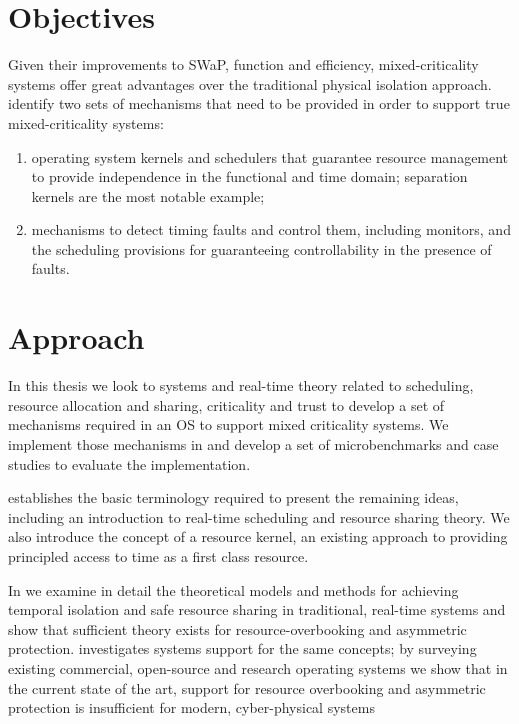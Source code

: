 \section{Objectives}

Given their improvements to \gls{SWaP}, function and efficiency, mixed-criticality systems offer
great advantages over the traditional physical isolation approach. 
\citet{Ernst_DiNatale_16} identify two sets of mechanisms that need to be provided in order to
support true mixed-criticality systems:

\begin{enumerate}
    \item operating system kernels and schedulers that guarantee resource
        management to provide independence in the
        functional and time domain; separation kernels
        are the most notable example;
    \item mechanisms to detect timing faults and control
        them, including monitors, and the scheduling
        provisions for guaranteeing controllability in the
        presence of faults.
\end{enumerate}


\section{Approach}

In this thesis we look to systems and real-time theory related to scheduling, resource allocation
and sharing, criticality and trust to develop a set of mechanisms required in an \gls{OS} to 
support mixed criticality systems. We implement those mechanisms in \selfour and develop a set of
microbenchmarks and case studies to evaluate the implementation. 

 establishes the basic terminology required to present
the remaining ideas, including an introduction to real-time scheduling and resource sharing theory.
We also introduce the concept of a resource kernel, an existing approach to providing principled
access to time as a first class resource.

In  we examine in detail the theoretical models and methods for achieving temporal
isolation and safe resource sharing in traditional, real-time systems and show that sufficient
theory exists for resource-overbooking and asymmetric protection. 
investigates systems support for the same concepts; by surveying existing commercial, open-source
and research operating systems we show that in the current state of the art, support for resource
overbooking and asymmetric protection is insufficient for modern, cyber-physical systems

